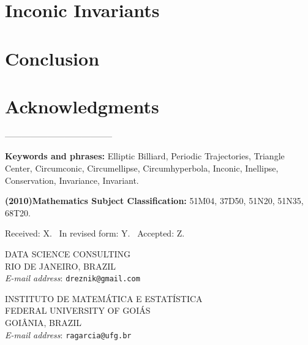 \documentclass[a4paper,11pt,leqno]{amsart}
\begin{document}
%

\section{Inconic Invariants}
\label{sec:inconic}


\section{Conclusion}
\label{sec:conclusion}


\section*{Acknowledgments}



 
%

\appendix



--------------------------------------

\textbf{Keywords and phrases: } Elliptic Billiard, Periodic Trajectories, Triangle Center, Circumconic, Circumellipse, Circumhyperbola, Inconic, Inellipse, Conservation, Invariance, Invariant.

\textbf{(2010)Mathematics Subject Classification: } 51M04, 37D50, 51N20, 51N35, 68T20.

Received: X. \ In revised form: Y. \ Accepted:
Z.\bigskip

\bigskip

\noindent DATA SCIENCE CONSULTING\\
RIO DE JANEIRO, BRAZIL\\
\textit{E-mail address}: \texttt{dreznik@gmail.com}

\bigskip
\bigskip

\noindent INSTITUTO DE MATEMÁTICA E ESTATÍSTICA\\
FEDERAL UNIVERSITY OF GOIÁS\\
GOIÂNIA, BRAZIL\\
\textit{E-mail address}: \texttt{ragarcia@ufg.br}\bigskip
\end{document}
